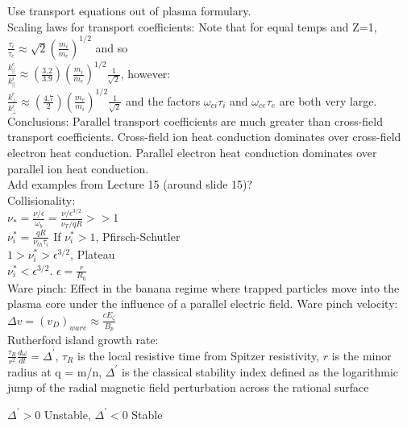 \documentclass[10pt]{extarticle}
\begin{document}
\begin{multicols}{3}
Use transport equations out of plasma formulary.\\
Scaling laws for transport coefficients:  Note that for equal temps and Z=1,\\
$\frac{\tau_{i}}{\tau_{e}} \approx \sqrt{2} (\frac{m_{i}}{m_{e}})^{1/2}$ 
and so\\ 
$\frac{k_{||}^{e}}{k_{||}^{i}} \approx (\frac{3.2}{3.9})(\frac{m_{i}}{m_{e}})^{1/2} \frac{1}{\sqrt{2}}$, however:\\
$\frac{k_{\perp}^{e}}{k_{\perp}^{i}} \approx (\frac{4.7}{2})(\frac{m_{e}}{m_{i}})^{1/2} \frac{1}{\sqrt{2}}$ and the factors $\omega_{ci}\tau_{i}$ and $\omega_{ce}\tau_{e}$ are both very large.  Conclusions: Parallel transport coefficients are much greater than cross-field transport coefficients. Cross-field ion heat conduction dominates over cross-field electron heat conduction.  Parallel electron heat conduction dominates over parallel ion heat conduction.\\

Add examples from Lecture 15 (around slide 15)?\\

 
 Collisionality:\\
 $\nu_{*} = \frac{\nu / \epsilon}{\omega_{b}} = \frac{\nu / \epsilon^{3/2}}{\nu_{T}/ qR} >> 1$\\
 $\nu_{i}^{*} = \frac{qR}{\nu_{th}\tau_{i}}$
 If $\nu_{i}^{*} > 1$, Pfirsch-Schutler\\
 $1 > \nu_{i}^{*} > \epsilon^{3/2}$, Plateau\\
 $\nu_{i}^{*} < \epsilon^{3/2}$.
 $\epsilon = \frac{r}{R_{0}}$\\ 
 
Ware pinch: Effect in the banana regime where trapped particles move into the plasma core under the influence of a parallel electric field. Ware pinch velocity: $\Delta v = (v_{D})_{ware} \approx \frac{cE_{\zeta}}{B_{p}}$\\ 

Rutherford island growth rate:\\
$\frac{\tau_{R}}{r^{2}} \frac{d\omega}{dt} = \Delta ^{\prime}$,
$\tau_{R}$ is the local resistive time from Spitzer resistivity,
$r$ is the minor radius at q = m/n,
$\Delta ^{\prime}$ is the classical stability index defined as the logarithmic jump of the radial magnetic field perturbation across the rational surface

$\Delta ^{\prime} > 0$ Unstable,
$\Delta ^{\prime} < 0$ Stable \\


\end{multicols}
\end{document}
